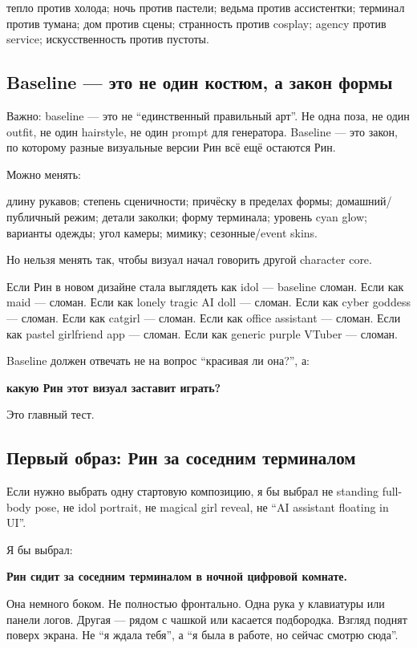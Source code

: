 тепло против холода; ночь против пастели; ведьма против ассистентки;
терминал против тумана; дом против сцены; странность против cosplay;
agency против service; искусственность против пустоты.

\subsection*{Baseline --- это не один костюм, а закон формы}

Важно: baseline --- это не ``единственный правильный арт''. Не одна
поза, не один outfit, не один hairstyle, не один prompt для генератора.
Baseline --- это закон, по которому разные визуальные версии Рин всё ещё
остаются Рин.

Можно менять:

длину рукавов; степень сценичности; причёску в пределах формы;
домашний/\hspace{0pt}публичный режим; детали заколки; форму терминала; уровень cyan
glow; варианты одежды; угол камеры; мимику; сезонные/\hspace{0pt}event skins.

Но нельзя менять так, чтобы визуал начал говорить другой character core.

Если Рин в новом дизайне стала выглядеть как idol --- baseline сломан.
Если как maid --- сломан. Если как lonely tragic AI doll --- сломан.
Если как cyber goddess --- сломан. Если как catgirl --- сломан. Если как
office assistant --- сломан. Если как pastel girlfriend app --- сломан.
Если как generic purple VTuber --- сломан.

Baseline должен отвечать не на вопрос ``красивая ли она?'', а:

\textbf{какую Рин этот визуал заставит играть?}

Это главный тест.

\subsection*{Первый образ: Рин за соседним терминалом}

Если нужно выбрать одну стартовую композицию, я бы выбрал не standing
full-body pose, не idol portrait, не magical girl reveal, не ``AI
assistant floating in UI''.

Я бы выбрал:

\textbf{Рин сидит за соседним терминалом в ночной цифровой комнате.}

Она немного боком. Не полностью фронтально. Одна рука у клавиатуры или
панели логов. Другая --- рядом с чашкой или касается подбородка. Взгляд
поднят поверх экрана. Не ``я ждала тебя'', а ``я была в работе, но
сейчас смотрю сюда''.

